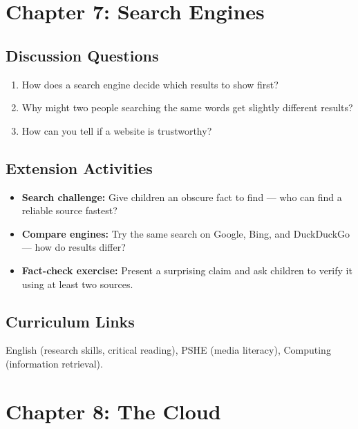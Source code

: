 \sectionrule

\section*{Chapter 7: Search Engines}

\subsection*{Discussion Questions}
\begin{enumerate}
  \item How does a search engine decide which results to show first?
  \item Why might two people searching the same words get slightly different results?
  \item How can you tell if a website is trustworthy?
\end{enumerate}

\subsection*{Extension Activities}
\begin{itemize}
  \item \textbf{Search challenge:} Give children an obscure fact to find — who can find a reliable source fastest?
  \item \textbf{Compare engines:} Try the same search on Google, Bing, and DuckDuckGo — how do results differ?
  \item \textbf{Fact-check exercise:} Present a surprising claim and ask children to verify it using at least two sources.
\end{itemize}

\subsection*{Curriculum Links}
English (research skills, critical reading), PSHE (media literacy), Computing (information retrieval).

\sectionrule

\section*{Chapter 8: The Cloud}

